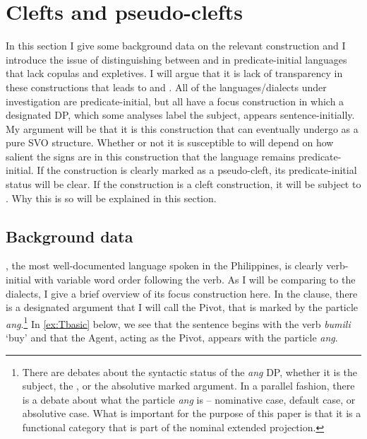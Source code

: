 \documentclass[output=paper]{langsci/langscibook}
\begin{document}
\section{Clefts and pseudo-clefts}

In this section I give some background data on the relevant construction and I
introduce the issue of distinguishing between  and  in
predicate-initial languages that lack copulas and expletives.  I will argue
that it is lack of transparency in these constructions that leads to 
and .   All of the languages/dialects under investigation are
predicate-initial, but all have a focus construction in which a designated DP,
which some analyses label the subject, appears sentence-initially.  My argument
will be that it is this construction that can eventually undergo  as
a pure SVO structure.  Whether or not it is susceptible to  will
depend on how salient the signs are in this construction that the language
remains predicate-initial.  If the construction is clearly marked as a
pseudo-cleft, its predicate-initial status will be clear.  If the construction
is a cleft construction, it will be subject to .  Why this is so will
be explained in this section.

\subsection{Background data}

, the most well-documented language spoken in the Philippines, is
clearly verb-initial with variable word order following the verb.  As I will be
comparing  to the  dialects, I give a brief overview of
its focus construction here.  In the  clause, there is a
designated argument that I will call the Pivot, that is marked by the particle
\emph{ang}.\footnote{There are debates about the syntactic status of the
    \emph{ang} DP, whether it is the subject, the , or the
    absolutive
    marked argument.  In a parallel fashion, there is a debate about what the
    particle \emph{ang} is -- nominative case, default case, or absolutive
    case.  What is important for the purpose of this paper is that it is a
    functional category that is part of the nominal extended projection.} In
    \eqref{ex:Tbasic} below, we see that the sentence begins with the verb
    \emph{bumili} `buy' and that the Agent, acting as the Pivot, appears with
    the particle \emph{ang}.
\end{document}
